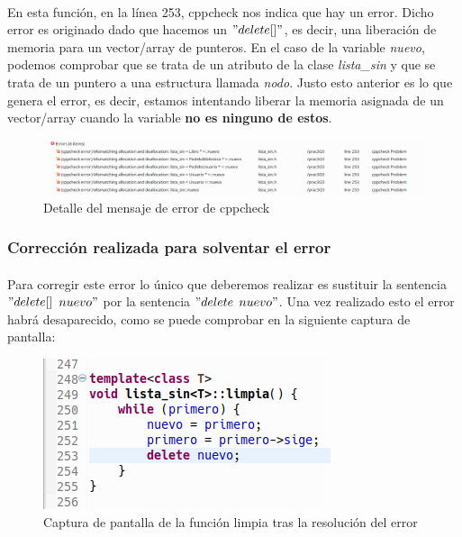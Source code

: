 			\paragraph{}En esta función, en la línea 253, cppcheck nos indica que hay un error. Dicho error es originado dado que hacemos un $"delete[]"$, es decir, una liberación de memoria para un vector/array de punteros. En el caso de la variable \textit{nuevo}, podemos comprobar que se trata de un atributo de la clase \textit{lista\_sin} y que se trata de un puntero a una estructura llamada \textit{nodo}. Justo esto anterior es lo que genera el error, es decir, estamos intentando liberar la memoria asignada de un vector/array cuando la variable \textbf{no es ninguno de estos}.
		
			\begin{figure}[H]
				\centering
				\includegraphics[scale=0.38]{img/captura49.png}
				\caption{Detalle del mensaje de error de cppcheck}
				\label{captura49}
			\end{figure}

		\subsubsection{Corrección realizada para solventar el error}
		
			\paragraph{}Para corregir este error lo único que deberemos realizar es sustituir la sentencia $"delete[]$ $nuevo"$ por la sentencia $"delete$ $nuevo"$. Una vez realizado esto el error habrá desaparecido, como se puede comprobar en la siguiente captura de pantalla:
		
			\begin{figure}[H]
				\centering
				\includegraphics[scale=0.7]{img/captura50.png}
				\caption{Captura de pantalla de la función limpia tras la resolución del error}
				\label{captura50}
			\end{figure}
		
